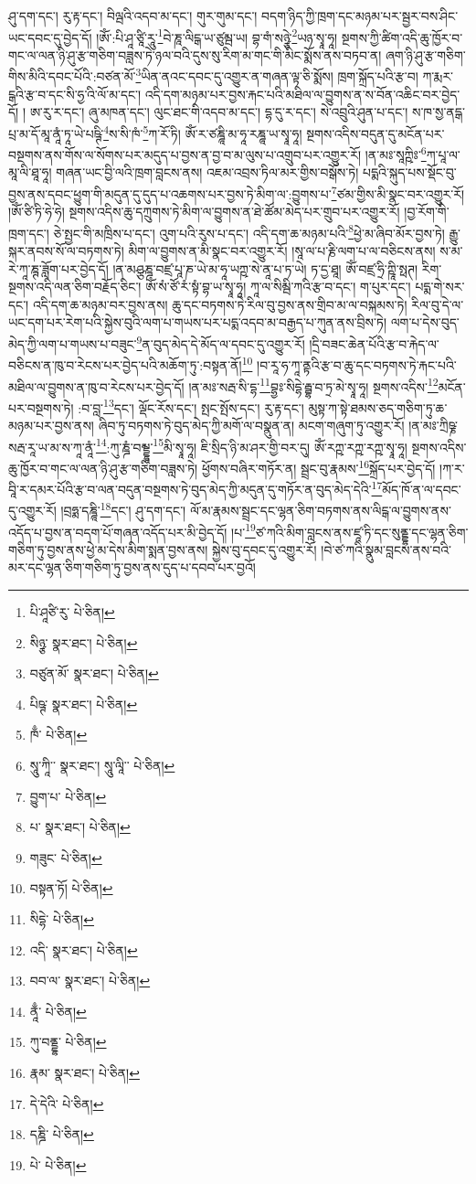 ཤུ་དག་དང་། རུ་རྟ་དང་། བིལྦའི་འདབ་མ་དང་། གུར་གུམ་དང་། བདག་ཉིད་ཀྱི་ཁྲག་དང་མཉམ་པར་སྦྱར་བས་ཤིང་ཡང་དབང་དུ་བྱེད་དོ། །ཨོཾ་:པི་ཤཱ་ཙཱི་རཱུ་\footnote{པི་ཤཱཙི་རུ་  པེ་ཅིན། }བེ་ཎཱ་ལིངྒ་ཡ་ཙུམྦ་ཡ། བྷ་གཾ་སཉྩེ་\footnote{སིཉྩ་  སྣར་ཐང་།  པེ་ཅིན། }ཡཉ་སྭཱ་ཧཱ། སྔགས་ཀྱི་ཚིག་འདི་ཆུ་ཁྱོར་བ་གང་ལ་ལན་ཉི་ཤུ་རྩ་གཅིག་བཟླས་ཏེ་ཉལ་བའི་དུས་སུ་རིག་མ་གང་གི་མིང་སྨོས་ནས་བཏབ་ན། ཞག་ཉི་ཤུ་རྩ་གཅིག་གིས་མིའི་དབང་པོའི་:བཙན་མོ་\footnote{བཙུན་མོ་  སྣར་ཐང་།  པེ་ཅིན། }ཡིན་ནའང་དབང་དུ་འགྱུར་ན་གཞན་ལྟ་ཅི་སྨོས། ཁྲག་སྐྲོད་པའི་རྩ་བ། ཀ་རྨར་ངྒའི་རྩ་བ་དང་སི་ཧྱ་འི་ལོ་མ་དང་། འདི་དག་མཉམ་པར་བྱས་རྐང་པའི་མཐིལ་ལ་བྱུགས་ན་ས་བོན་འཆིང་བར་བྱེད་དོ། །
ཨ་རུ་ར་དང་། ཞུ་མཁན་དང་། ལུང་ཐང་གི་འདབ་མ་དང་། དྷ་དུ་ར་དང་། སེ་འབྲུའི་ཤུན་པ་དང་། ས་ཁ་སྱ་ནདྒ་པྲ་མ་དོ་མཱ་ནཱཾ་ཏཱ་ཡེ་པཥྚི་\footnote{པིཥྚ་  སྣར་ཐང་།  པེ་ཅིན། }ས་སི་ཁཾ་\footnote{ཁྃ་  པེ་ཅིན། }ཀ་རོ་ཏི། ཨོཾ་ར་ཙཎྜཱི་མ་ཧཱ་རཎྜཱ་ཡ་སྭཱ་ཧཱ། སྔགས་འདིས་བདུན་དུ་མངོན་པར་བསྔགས་ནས་གོས་ལ་སོགས་པར་མདུད་པ་བྱས་ན་བྱ་བ་མ་ལུས་པ་འགྲུབ་པར་འགྱུར་རོ། །ན་མཿ་སཱཀྵིཿ་\footnote{སཱུ་ཀཱི་་  སྣར་ཐང་། སཱུ་ལཱི་་  པེ་ཅིན། }ཀ་པཱ་ལ་མཱ་ལི་ཐཱ་ཧཱ། གཞན་ཡང་བྱི་ལའི་ཁྲག་བླངས་ནས། འཇམ་འབྲས་ཏིལ་མར་གྱིས་བསྒོས་ཏེ། པདྨའི་སྐུད་པས་སྡོང་བུ་བྱས་ནས་དབང་ཕྱུག་གི་མདུན་དུ་དུད་པ་འཆགས་པར་བྱས་ཏེ་མིག་ལ་:བྱུགས་པ་\footnote{བྱུག་པ་  པེ་ཅིན། }ཙམ་གྱིས་མི་སྣང་བར་འགྱུར་རོ། །ཨོཾ་ཙི་ཏི་ཧེ་ཧེ། སྔགས་འདིས་ཆུ་དཀྲུགས་ཏེ་མིག་ལ་བྱུགས་ན་ཐེ་ཚོམ་མེད་པར་གྲུབ་པར་འགྱུར་རོ། །བྱ་རོག་གི་ཁྲག་དང་། ཅེ་སྤྱང་གི་མཁྲིས་པ་དང་། འུག་པའི་རུས་པ་དང་། འདི་དག་ཆ་མཉམ་པའི་\footnote{པ་  སྣར་ཐང་།  པེ་ཅིན། }ཕྱེ་མ་ཞིབ་མོར་བྱས་ཏེ། རྒྱུ་སྐར་ནབས་སོ་ལ་བཏགས་ཏེ། མིག་ལ་བྱུགས་ན་མི་སྣང་བར་འགྱུར་རོ། །སཱ་ལ་པ་རྞི་ལག་པ་ལ་བཅིངས་ནས། ས་མ་རེ་ཀཱ་ཎྚ་ཟློག་པར་བྱེད་དོ། །ན་མཤྩཎྜ་བཛྲ་པཱ་ཎ་ཡེ་མ་ཧཱ་ཡཀྵ་སེ་ནཱ་པ་ཏ་ཡེ། ཏ་དྱ་ཐཱ། ཨོཾ་བཛྲ་ཧྲི་ཀྵཱི་སྥཊ། རིག་སྔགས་འདི་ལན་ཅིག་བརྗོད་ཅིང་། ཨོཾ་སཾ་ཙོ་རཾ་སྟཾ་བྷ་ཡ་སྭཱ་ཧཱ། ཀཱ་ལ་སིམྦི་ཀའི་རྩ་བ་དང་། ག་པུར་དང་། པདྨ་གེ་སར་དང་། འདི་དག་ཆ་མཉམ་བར་བྱས་ནས། ཆུ་དང་བཏགས་ཏེ་རིལ་བུ་བྱས་ནས་གྲིབ་མ་ལ་བསྐམས་ཏེ། རིལ་བུ་དེ་ལ་ཡང་དག་པར་རེག་པའི་སྐྱེས་བུའི་ལག་པ་གཡས་པར་པདྨ་འདབ་མ་བརྒྱད་པ་ཀུན་ནས་བྲིས་ཏེ། ལག་པ་དེས་བུད་མེད་ཀྱི་ལག་པ་གཡས་པ་བཟུང་\footnote{གཟུང་  པེ་ཅིན། }ན་བུད་མེད་དེ་མོད་ལ་དབང་དུ་འགྱུར་རོ། །དྲི་བཟང་ཆེན་པོའི་རྩ་བ་རྐེད་ལ་བཅིངས་ན་ཁུ་བ་རེངས་པར་བྱེད་པའི་མཆོག་ཏུ་:བསྟན་ནོ།\footnote{བསྟན་ཏོ།  པེ་ཅིན། } །བ་རཱ་ཧ་ཀཱ་ནྟའི་རྩ་བ་ཆུ་དང་བཏགས་ཏེ་རྐང་པའི་མཐིལ་ལ་བྱུགས་ན་ཁུ་བ་རེངས་པར་བྱེད་དོ། །ན་མཿ་སརྦ་སི་དྷ་\footnote{སིདྷེ་  པེ་ཅིན། }བྷྱཿ་སིདྷེ་རྦྷ་བ་ཏྲ་མེ་སྭཱ་ཧཱ། སྔགས་འདིས་\footnote{འདི་  སྣར་ཐང་།  པེ་ཅིན། }མངོན་པར་བསྔགས་ཏེ། :བ་བླ་\footnote{བབ་ལ་  སྣར་ཐང་།  པེ་ཅིན། }དང་། ལྡོང་རོས་དང་། སྤང་སྤོས་དང་། རུ་རྟ་དང་། མུསྟ་ཀ་སྟེ་ཐམས་ཅད་གཅིག་ཏུ་ཆ་མཉམ་པར་བྱས་ནས། ཞིབ་ཏུ་བཏགས་ཏེ་བུད་མེད་ཀྱི་མགོ་ལ་བསྣུན་ན། མངག་གཞུག་ཏུ་འགྱུར་རོ། །ན་མཿ་ཀྲིཥྞ་སརྦ་རཱ་ཡ་མ་ས་ཀཱ་ནཱཾ་\footnote{ནཱྃ་  པེ་ཅིན། }:ཀུ་ཎྜཾ་བམྡྷཱ་\footnote{ཀུ་བནྡྷ་  པེ་ཅིན། }མི་སྭཱ་ཧཱ། ཇི་སྲིད་ཉི་མ་ཤར་གྱི་བར་དུ། ཨོཾ་རཀྵ་རཀྵ་རཀྵ་སྭཱ་ཧཱ། སྔགས་འདིས་ཆུ་ཁྱོར་བ་གང་ལ་ལན་ཉི་ཤུ་རྩ་གཅིག་བཟླས་ཏེ། ཕྱོགས་བཞིར་གཏོར་ན། སྦྲང་བུ་རྣམས་\footnote{རྣམ་  སྣར་ཐང་།  པེ་ཅིན། }སྐྲོད་པར་བྱེད་དོ། །ཀ་ར་བཱི་ར་དམར་པོའི་རྩ་བ་ལན་བདུན་བསྔགས་ཏེ་བུད་མེད་ཀྱི་མདུན་དུ་གཏོར་ན་བུད་མེད་དེའི་\footnote{དེ་དེའི་  པེ་ཅིན། }མོད་ཁོ་ན་ལ་དབང་དུ་འགྱུར་རོ། །བྲཧྨ་དཎྜཱི་\footnote{དཎྜི་  པེ་ཅིན། }དང་། ཤུ་དག་དང་། ལོ་མ་རྣམས་སྦྲང་དང་ལྷན་ཅིག་བཏགས་ནས་ལིངྒ་ལ་བྱུགས་ནས་འདོད་པ་བྱས་ན་བདག་པོ་གཞན་འདོད་པར་མི་བྱེད་དོ། །པ་\footnote{པེ་  པེ་ཅིན། }ཙ་ཀའི་མིག་བླངས་ནས་ཛཱ་ཏི་དང་སུནྡྷ་དང་ལྷན་ཅིག་གཅིག་ཏུ་བྱས་ནས་ཕྱེ་མ་དེས་མིག་སྨན་བྱས་ནས། སྐྱེས་བུ་དབང་དུ་འགྱུར་རོ། །བེ་ཙ་ཀའི་སྣུམ་བླངས་ནས་བའི་མར་དང་ལྷན་ཅིག་གཅིག་ཏུ་བྱས་ནས་དུད་པ་དབབ་པར་བྱའོ། 